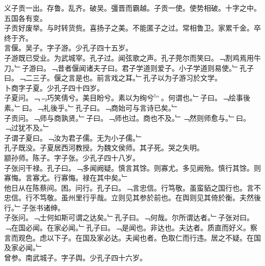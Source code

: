 \documentclass{zhvt-classic}
\begin{document}
\hspace*{2em}义子贡一出。存鲁。乱齐。破吴。彊晋而霸越。子贡一使。使势相破。十字之中。五国各有变。\\
\hspace*{2em}子贡好废举。与时转货赀。喜扬子之美。不能匿子之过。常相鲁卫。家累千金。卒终于齐。\\
\hspace*{2em}言偃。吴子。字子游。少孔子四十五岁。\\
\hspace*{2em}子游既已受业。为武城宰。孔子过。闻弦歌之声。孔子莞尔而笑曰。﹁割鸡焉用牛刀。﹂子游曰。﹁昔者偃闻诸夫子曰。君子学道则爱子。小子学道则易使。﹂孔子曰。﹁二三子。偃之言是也。前言戏之耳。﹂孔子以为子游习於文学。\\
\hspace*{2em}卜商字子夏。少孔子四十四岁。\\
\hspace*{2em}子夏问。﹁﹃巧笑倩兮。美目盼兮。素以为绚兮﹄。何谓也。﹂子曰。﹁绘事後素。﹂曰。﹁礼後乎。﹂孔子曰。﹁商始可与言诗已矣。﹂\\
\hspace*{2em}子贡问。﹁师与商孰贤。﹂子曰。﹁师也过。商也不及。﹂﹁然则师愈与。﹂曰。﹁过犹不及。﹂\\
\hspace*{2em}子谓子夏曰。﹁汝为君子儒。无为小子儒。﹂\\
\hspace*{2em}孔子既没。子夏居西河教授。为魏文侯师。其子死。哭之失明。\\
\hspace*{2em}颛孙师。陈子。字子张。少孔子四十八岁。\\
\hspace*{2em}子张问干禄。孔子曰。﹁多闻阙疑。慎言其馀。则寡尤。多见阙殆。慎行其馀。则寡悔。言寡尤。行寡悔。禄在其中矣。﹂\\
\hspace*{2em}他日从在陈蔡间。困。问行。孔子曰。﹁言忠信。行笃敬。虽蛮貊之国行也。言不忠信。行不笃敬。虽州里行乎哉。立则见其参於前也。在舆则见其倚於衡。夫然後行。﹂子张书诸绅。\\
\hspace*{2em}子张问。﹁士何如斯可谓之达矣。﹂孔子曰。﹁何哉。尔所谓达者。﹂子张对曰。﹁在国必闻。在家必闻。﹂孔子曰。﹁是闻也。非达也。夫达者。质直而好义。察言而观色。虑以下子。在国及家必达。夫闻也者。色取仁而行违。居之不疑。在国及家必闻。﹂\\
\hspace*{2em}曾参。南武城子。字子舆。少孔子四十六岁。\\
\end{document}
